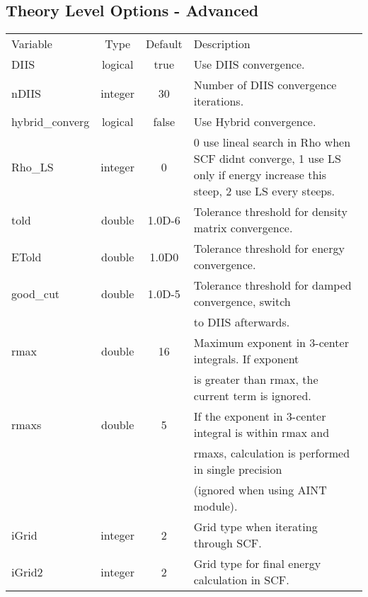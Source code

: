 \documentclass[journal=jctcce,manuscript=article]{achemso}
\begin{document}
    \subsection{Theory Level Options - Advanced}
    \begin{table}  [H]
      \begin{center}
      \begin{tabular}{ l c c l}
         Variable        & Type    & Default & Description \\
         DIIS            & logical & true    & Use DIIS convergence. \\
         nDIIS           & integer & 30      & Number of DIIS convergence iterations. \\
         hybrid\_converg & logical & false   & Use Hybrid convergence. \\
         Rho\_LS         & integer & 0       & 0 use lineal search in Rho when SCF didnt converge, 1 use LS only if energy increase this steep, 2 use LS every steeps. \\
         told            & double  & 1.0D-6  & Tolerance threshold for density matrix convergence.\\
         ETold           & double  & 1.0D0   & Tolerance threshold for energy convergence.\\
         good\_cut       & double  & 1.0D-5  & Tolerance threshold for damped convergence, switch \\
         & &                                 & to DIIS afterwards.\\
         rmax            & double  & 16      & Maximum exponent in 3-center integrals. If exponent \\
         & &                                 & is greater than rmax, the current term is ignored.\\
         rmaxs           & double  & 5       & If the exponent in 3-center integral is within rmax and \\
         & &                                 & rmaxs, calculation is performed in single precision \\
         & &                                 & (ignored when using AINT module).\\
         iGrid           & integer & 2       & Grid type when iterating through SCF.\\
         iGrid2          & integer & 2       & Grid type for final energy calculation in SCF.\\         
       \end{tabular}
       \end{center}
      \label{lio.theorya.var}
    \end{table}    
    
\end{document}
